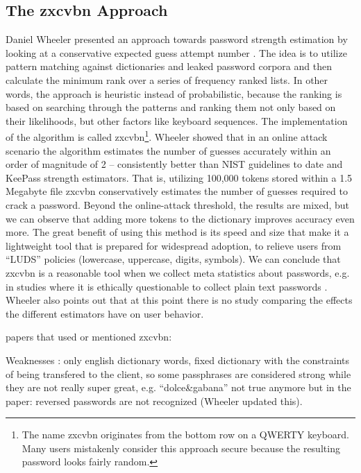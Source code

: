 	\subsection{The zxcvbn Approach}
	Daniel Wheeler presented an approach towards password strength estimation by looking at a conservative expected guess attempt number \cite{Wheeler2016zxcvbn}. The idea is to utilize pattern matching against dictionaries and leaked password corpora and then calculate the minimum rank over a series of frequency ranked lists. In other words, the approach is heuristic instead of probabilistic, because the ranking is based on searching through the patterns and ranking them not only based on their likelihoods, but other factors like keyboard sequences. The implementation of the algorithm is called zxcvbn\footnote{The name zxcvbn originates from the bottom row on a QWERTY keyboard. Many users mistakenly consider this approach secure because the resulting password looks fairly random.}. Wheeler showed that in an online attack scenario \cite{Florencio2014AdministratorsGuide} the algorithm estimates the number of guesses accurately within an order of magnitude of 2 -- consistently better than NIST guidelines to date and KeePass strength estimators. That is, utilizing 100,000 tokens stored within a 1.5 Megabyte file zxcvbn conservatively estimates the number of guesses required to crack a password. Beyond the online-attack threshold, the results are mixed, but we can observe that adding more tokens to the dictionary improves accuracy even more. The great benefit of using this method is its speed and size that make it a lightweight tool that is prepared for widespread adoption, to relieve users from ``LUDS'' policies (lowercase, uppercase, digits, symbols). We can conclude that zxcvbn is a reasonable tool when we collect meta statistics about passwords, e.g. in studies where it is ethically questionable to collect plain text passwords \cite{Seitz2016SuggestionsDecoy}. Wheeler also points out that at this point there is no study comparing the effects the different estimators have on user behavior. 
	
	papers that used or mentioned zxcvbn:
	\cite{Komanduri2014Telepathwords}
	\cite{Wang2016fuzzyPWM}
	\cite{Ur2017DataDrivenPWMeter}
	\cite{Yang2016MnemonicSentenceBased}
	\cite{Gross2016CognitiveDepletion}
	
	Weaknesses \cite{DeCarnedeCarnavalet2015PasswordMeters}: only english dictionary words, fixed dictionary with the constraints of being transfered to the client, so some passphrases are considered strong while they are not really super great, e.g. ``dolce\&gabana''
	not true anymore but in the paper: reversed passwords are not recognized (Wheeler updated this). 
	
